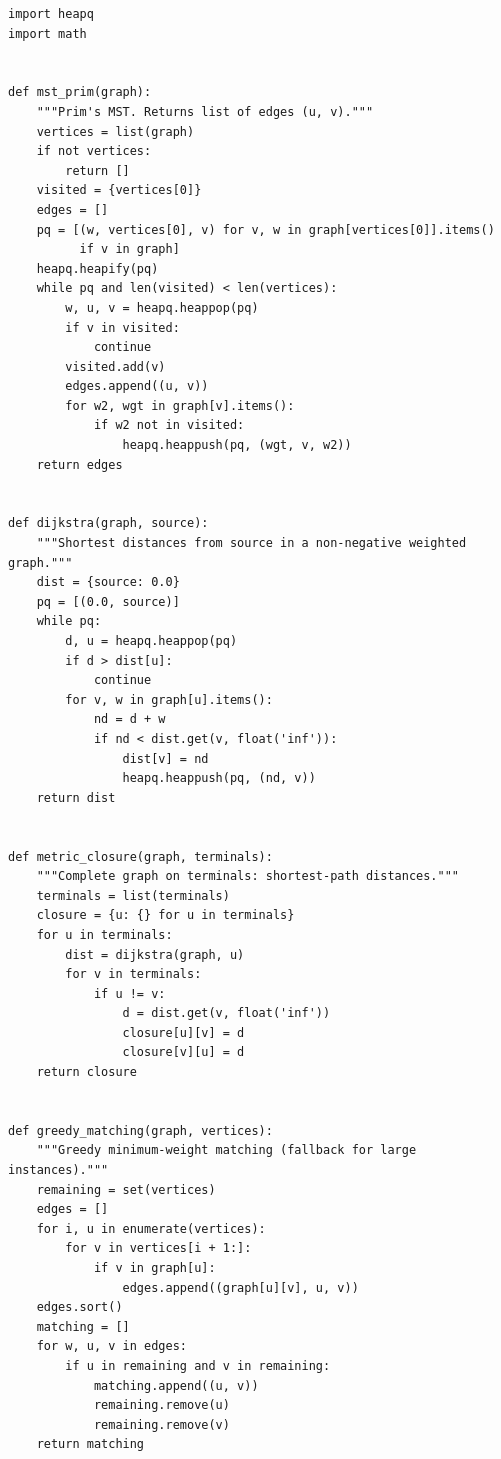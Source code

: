 \begin{lstlisting}[style=python, caption=Christofides TSP 3/2-Approximation]
import heapq
import math


def mst_prim(graph):
    """Prim's MST. Returns list of edges (u, v)."""
    vertices = list(graph)
    if not vertices:
        return []
    visited = {vertices[0]}
    edges = []
    pq = [(w, vertices[0], v) for v, w in graph[vertices[0]].items()
          if v in graph]
    heapq.heapify(pq)
    while pq and len(visited) < len(vertices):
        w, u, v = heapq.heappop(pq)
        if v in visited:
            continue
        visited.add(v)
        edges.append((u, v))
        for w2, wgt in graph[v].items():
            if w2 not in visited:
                heapq.heappush(pq, (wgt, v, w2))
    return edges


def dijkstra(graph, source):
    """Shortest distances from source in a non-negative weighted graph."""
    dist = {source: 0.0}
    pq = [(0.0, source)]
    while pq:
        d, u = heapq.heappop(pq)
        if d > dist[u]:
            continue
        for v, w in graph[u].items():
            nd = d + w
            if nd < dist.get(v, float('inf')):
                dist[v] = nd
                heapq.heappush(pq, (nd, v))
    return dist


def metric_closure(graph, terminals):
    """Complete graph on terminals: shortest-path distances."""
    terminals = list(terminals)
    closure = {u: {} for u in terminals}
    for u in terminals:
        dist = dijkstra(graph, u)
        for v in terminals:
            if u != v:
                d = dist.get(v, float('inf'))
                closure[u][v] = d
                closure[v][u] = d
    return closure


def greedy_matching(graph, vertices):
    """Greedy minimum-weight matching (fallback for large instances)."""
    remaining = set(vertices)
    edges = []
    for i, u in enumerate(vertices):
        for v in vertices[i + 1:]:
            if v in graph[u]:
                edges.append((graph[u][v], u, v))
    edges.sort()
    matching = []
    for w, u, v in edges:
        if u in remaining and v in remaining:
            matching.append((u, v))
            remaining.remove(u)
            remaining.remove(v)
    return matching



\end{lstlisting}
